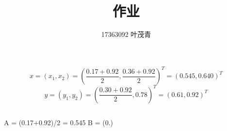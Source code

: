 \documentclass[12pt,onecolumn,letterpaper]{article}
\begin{document}
    \title{作业}
    \author{17363092 叶茂青}

    \maketitle

    \section{}
    \[x=\left(x_{1}, x_{2}\right)=\left(\frac{0.17+0.92}{2}, \frac{0.36+0.92}{2}\right)^{T}=\left(0.545,0.640\right)^{T}\]
    \[y=\left(y_{1}, y_{2}\right)=\left(\frac{0.30+0.92}{2}, 0.78\right)^{T}=\left(0.61,0.92\right)^{T}\]
    \subsection{}
    A = (0.17+0.92)/2 = 0.545
    B = (0.)
    \subsection{}

    \section{}
    \subsection{}
    \subsection{}
    \subsection{}

    {\small
         
        
    }
\end{document}
